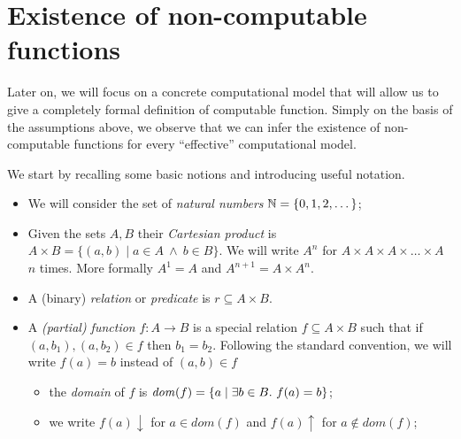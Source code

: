 \section{Existence of non-computable functions}

Later on, we will focus on a concrete computational model that will allow
us to give a completely formal definition of computable function. Simply on the basis of the assumptions above, we observe that we can infer the existence of non-computable functions for every ``effective'' computational model.

We start by recalling some basic notions and introducing useful notation.

\begin{itemize}
\item We will consider the set of \emph{natural numbers}
  $\mathbb{N} = \{ 0, 1, 2, \dots \}$;

\item Given the sets $A, B$ their \emph{Cartesian product} is
  $A \times B = \{ (a,b) \mid a \in A\ \land\ b \in B\}$. We will
  write $A^n$ for $A \times A \times A \times \ldots \times A$ $n$
  times. More formally $A^1 = A$ and $ A^{n+1} = A \times A^n$.

\item A (binary) \emph{relation} or \emph{predicate} is
  $r \subseteq A \times B$.

\item A \emph{(partial) function} $f : A \to B$ is a special relation $f \subseteq A\times B$ such that if $(a, b_1), (a, b_2) \in f$ then  $b_1 = b_2$.  Following the standard convention, we will write $f(a) = b$ instead
  of $(a, b)\in f$
  \begin{itemize}
  \item the \emph{domain} of $f$ is
    $\mathit{dom}({f}) = \{a \mid \exists b \in B.\ f(a) = b \}$;

  \item we write $f(a) \downarrow$ for $a \in dom (f)$ and
    $f(a) \uparrow$ for $a \not\in dom (f)$;
  \end{itemize}


\end{itemize}
